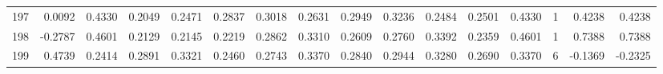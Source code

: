 \begin{tabular}{lrrrrrrrrrrrrrrr}
197 &      0.0092 &  0.4330 &  0.2049 &  0.2471 &  0.2837 &  0.3018 &  0.2631 &  0.2949 &  0.3236 &  0.2484 &   0.2501 &     0.4330 &      1 &                    0.4238 &                     0.4238 \\
198 &     -0.2787 &  0.4601 &  0.2129 &  0.2145 &  0.2219 &  0.2862 &  0.3310 &  0.2609 &  0.2760 &  0.3392 &   0.2359 &     0.4601 &      1 &                    0.7388 &                     0.7388 \\
199 &      0.4739 &  0.2414 &  0.2891 &  0.3321 &  0.2460 &  0.2743 &  0.3370 &  0.2840 &  0.2944 &  0.3280 &   0.2690 &     0.3370 &      6 &                   -0.1369 &                    -0.2325 \\
\bottomrule
\end{tabular}
